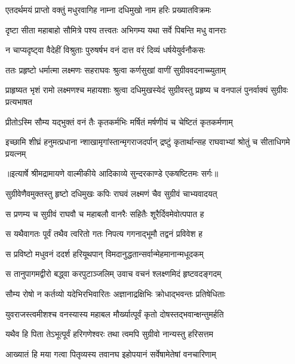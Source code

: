 \twolineshloka
{एतदर्थमयं प्राप्तो वक्तुं मधुरवागिह}
{नाम्ना दधिमुखो नाम हरिः प्रख्यातविक्रमः} %

\twolineshloka
{दृष्टा सीता महाबाहो सौमित्रे पश्य तत्त्वतः}
{अभिगम्य यथा सर्वे पिबन्ति मधु वानराः} %

\twolineshloka
{न चाप्यदृष्ट्वा वैदेहीं विश्रुताः पुरुषर्षभ}
{वनं दात्त वरं दिव्यं धर्षयेयुर्वनौकसः} %

\twolineshloka
{ततः प्रहृष्टो धर्मात्मा लक्ष्मणः सहराघवः}
{श्रुत्वा कर्णसुखां वाणीं सुग्रीववदनाच्च्युताम्} %

\threelineshloka
{प्राहृष्यत भृशं रामो लक्ष्मणश्च महायशाः}
{श्रुत्वा दधिमुखस्येदं सुग्रीवस्तु प्रहृष्य च}
{वनपालं पुनर्वाक्यं सुग्रीवः प्रत्यभाषत} %

\twolineshloka
{प्रीतोऽस्मि सौम्य यद्भुक्तं वनं तैः कृतकर्मभिः}
{मर्षितं मर्षणीयं च चेष्टितं कृतकर्मणाम्} %

\fourlineindentedshloka
{इच्छामि शीघ्रं हनुमत्प्रधाना}
{न्शाखामृगांस्तान्मृगराजदर्पान्}
{द्रष्टुं कृतार्थान्सह राघवाभ्यां}
{ श्रोतुं च सीताधिगमे प्रयत्नम्} %


{॥इत्यार्षे श्रीमद्रामायणे वाल्मीकीये आदिकाव्ये सुन्दरकाण्डे एकषष्टितमः सर्गः॥}


\twolineshloka
{सुग्रीवेणैवमुक्तस्तु हृष्टो दधिमुखः कपिः}
{राघवं लक्ष्मणं चैव सुग्रीवं चाभ्यवादयत्} %

\twolineshloka
{स प्रणम्य च सुग्रीवं राघवौ च महाबलौ}
{वानरैः सहितैः शूरैर्दिवमेवोत्पपात ह} %

\twolineshloka
{स यथैवागतः पूर्वं तथैव त्वरितो गतः}
{निपत्य गगनाद्भूमौ तद्वनं प्रविवेश ह} %

\twolineshloka
{स प्रविष्टो मधुवनं ददर्श हरियूथपान्}
{विमदानुद्धतान्सर्वान्मेहमानान्मधूदकम्} %

\twolineshloka
{स तानुपागमद्वीरो बद्ध्वा करपुटाञ्जलिम्}
{उवाच वचनं श्लक्ष्णमिदं हृष्टवदङ्गदम्} %

\twolineshloka
{सौम्य रोषो न कर्तव्यो यदेभिरभिवारितः}
{अज्ञानाद्रक्षिभिः क्रोधाद्भवन्तः प्रतिषेधिताः} %

\twolineshloka
{युवराजस्त्वमीशश्च वनस्यास्य महाबल}
{मौर्ख्यात्पूर्वं कृतो दोषस्तद्भवान्क्षन्तुमर्हति} %

\twolineshloka
{यथैव हि पिता तेऽभूत्पूर्वं हरिगणेश्वरः}
{तथा त्वमपि सुग्रीवो नान्यस्तु हरिसत्तम} %

\twolineshloka
{आख्यातं हि मया गत्वा पितृव्यस्य तवानघ}
{इहोपयानं सर्वेषामेतेषां वनचारिणाम्} %

